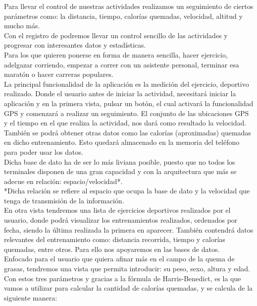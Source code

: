 \documentclass[a4paper, 11pt]{article}
\begin{document}
      Para llevar el control de nuestras actividades realizamos un seguimiento de
      ciertos parámetros como: la distancia, tiempo, calorías quemadas, velocidad,
      altitud y mucho más.\\

      Con el registro de podremos llevar un control sencillo de las actividades y
      progresar con interesantes datos y estadísticas.\\

      Para los que quieren ponerse en forma de manera sencilla, hacer ejercicio,
      adelgazar corriendo, empezar a correr con un asistente personal, terminar esa
      maratón o hacer carreras populares.\\

      La principal funcionalidad de la aplicación es la medición del ejercicio,
      deportivo realizado. Donde el usuario antes de iniciar la actividad, necesitará
      iniciar la aplicación y en la primera vista, pulsar un botón, el cual activará
      la funcionalidad GPS y comenzará a realizar un seguimiento. El conjunto de las
      ubicaciones GPS y el tiempo en el que realiza la actividad, nos dará como
      resultado la velocidad. También se podrá obtener otras datos como las calorías
      (aproximadas) quemadas en dicho entrenamiento. Esto quedará almacenado en la
      memoria del teléfono para poder usar los datos.\\

      Dicha base de dato ha de ser lo más liviana posible, puesto que no todos los
      terminales disponen de una gran capacidad y con la arquitectura que más se
      adecue en relación: espacio/velocidad*.\\

      *Dicha relación se refiere al espacio que ocupa la base de dato y la velocidad
      que tenga de transmisión de la información.\\

      En otra vista tendremos una lista de ejercicios deportivos realizados por el
      usuario, donde podrá visualizar los entrenamientos realizados, ordenados por
      fecha, siendo la última realizada la primera en aparecer. También contendrá
      datos relevantes del entrenamiento como: distancia recorrida, tiempo y calorías
      quemadas, entre otros. Para ello nos apoyaremos en las bases de datos.\\

      Enfocado para el usuario que quiera afinar más en el campo de la quema de
      grasas, tendremos una vista que permita introducir: su peso, sexo, altura y
      edad. Con estos tres parámetros y gracias a la fórmula de Harris-Benedict, es la
      que vamos a utilizar para calcular la cantidad de calorías quemadas, y se
      calcula de la siguiente manera:
\end{document}
